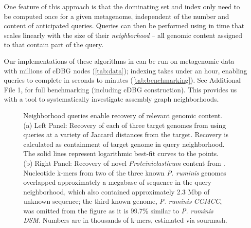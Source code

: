 One feature of this approach is that the dominating set and index only need to be computed once for a given metagenome, independent of the number and content of anticipated queries.
Queries
can then be performed using  in time that
scales linearly with the size of their {\em neighborhood} --
all genomic content assigned to \pieces that contain part of the query.

Our implementations of these algorithms in \sgc can be run on
metagenomic data with millions of cDBG nodes (\autoref{tab:data});
indexing takes under an hour, enabling queries to complete in seconds
to minutes (\autoref{tab:benchmarking}). See Additional File 1, 
for full benchmarking (including cDBG construction). This
provides us with a tool to systematically investigate assembly graph
neighborhoods.




\begin{figure}
  \centering
  \hspace*{2cm}%
  \hspace*{1cm}%
	\caption{Neighborhood queries enable recovery of relevant genomic content.
  (a) Left Panel: Recovery of each of three target genomes from \podarv
  using queries at a variety of Jaccard distances from the target. Recovery is
  calculated as containment of target genome in query neighborhood. The solid lines represent logarithmic best-fit curves to the points.
  (b) Right Panel: Recovery of novel {\em Proteiniclasticum } content
  from \podarv. Nucleotide k-mers from two of the three known {\em P. ruminis} genomes
  overlapped approximately a megabase of sequence in the query neighborhood,
  which also contained approximately 2.3 Mbp of unknown sequence; the third known genome, {\em P. ruminis CGMCC}, was omitted from the figure as it is 99.7\% similar to {\em P. ruminis DSM}. Numbers are in thousands of k-mers, estimated via sourmash.}\label{fig:partial_query}
\end{figure}

